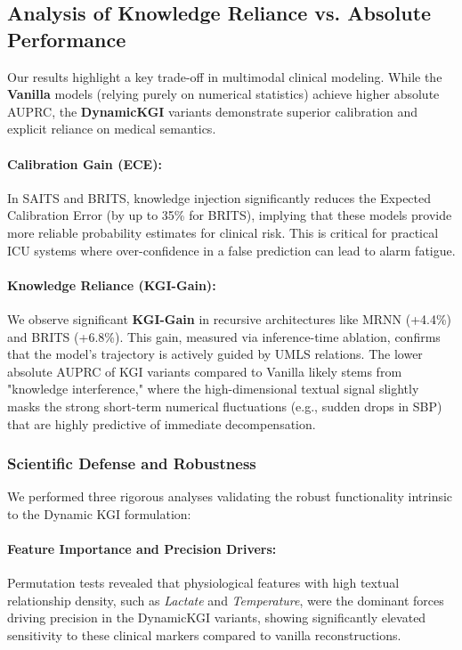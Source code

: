 \subsection{Analysis of Knowledge Reliance vs. Absolute Performance}
Our results highlight a key trade-off in multimodal clinical modeling. While the \textbf{Vanilla} models (relying purely on numerical statistics) achieve higher absolute AUPRC, the \textbf{DynamicKGI} variants demonstrate superior calibration and explicit reliance on medical semantics.

\paragraph{Calibration Gain (ECE):} In SAITS and BRITS, knowledge injection significantly reduces the Expected Calibration Error (by up to 35\% for BRITS), implying that these models provide more reliable probability estimates for clinical risk. This is critical for practical ICU systems where over-confidence in a false prediction can lead to alarm fatigue.

\paragraph{Knowledge Reliance (KGI-Gain):} We observe significant \textbf{KGI-Gain} in recursive architectures like MRNN (+4.4\%) and BRITS (+6.8\%). This gain, measured via inference-time ablation, confirms that the model's trajectory is actively guided by UMLS relations. The lower absolute AUPRC of KGI variants compared to Vanilla likely stems from "knowledge interference," where the high-dimensional textual signal slightly masks the strong short-term numerical fluctuations (e.g., sudden drops in SBP) that are highly predictive of immediate decompensation.

\subsubsection{Scientific Defense and Robustness}
We performed three rigorous analyses validating the robust functionality intrinsic to the Dynamic KGI formulation:

\paragraph{Feature Importance and Precision Drivers:}
Permutation tests revealed that physiological features with high textual relationship density, such as \textit{Lactate} and \textit{Temperature}, were the dominant forces driving precision in the DynamicKGI variants, showing significantly elevated sensitivity to these clinical markers compared to vanilla reconstructions.

